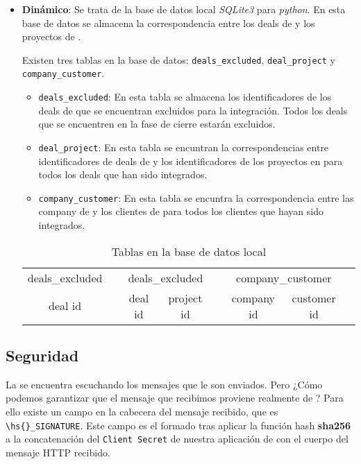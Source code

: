 \begin{itemize}[leftmargin=*]
\item \textbf{Dinámico}: Se trata de la base de datos local \textit{SQLite3} \cite{sqlite3} para \textit{python}.
 En esta base de datos se almacena la correspondencia entre los deals de \hs{} y los proyectos de \wday.
 
 Existen tres tablas en la base de datos: \verb|deals_excluded|, \verb|deal_project| y \verb|company_customer|.
 
 
 \begin{itemize}
	\item \verb|deals_excluded|: En esta tabla se almacena los identificadores de los deals de \hs{} 
	que se encuentran excluidos para la integración. Todos los deals que se encuentren en la fase de
	cierre estarán excluidos.
	\item \verb|deal_project|: En esta tabla se encuntran la correspondencias entre identificadores 
	de deals de \hs{} y los identificadores de los proyectos en \wday{} para todos los deals que han sido integrados.
	\item \verb|company_customer|: En esta tabla se encuntra la correspondencia entre las company de \hs{} y los clientes de \wday{}
	para todos los clientes que hayan sido integrados.
 \end{itemize}
 
\begin{table}
		\centering
		\begin{tabular}{
		|c|c@{\hskip 1cm} 
		|c|c|c@{\hskip 1cm} 
		|c|c|c@{\hskip 1cm}
		}
		\cline{1-1}\cline{3-4}\cline{6-7}
		deals\_excluded && \multicolumn{2}{c|}{deals\_excluded} && \multicolumn{2}{c|}{company\_customer} \\
	\cline{1-1}\cline{3-4}\cline{6-7}
	deal id && deal id & project id && company id & customer id \\
	\cline{1-1}\cline{3-4}\cline{6-7}
	\end{tabular}
	\caption{Tablas en la base de datos local}
	\label{tab:tables}
\end{table}

\end{itemize}




\subsection{Seguridad}


La \iface{} se encuentra escuchando los mensajes que le son enviados. Pero ¿Cómo podemos garantizar que el mensaje que recibimos proviene realmente de \hs{}?
Para ello existe un campo en la cabecera del mensaje recibido, que es \verb|\hs{}_SIGNATURE|. 
Este campo es el formado tras aplicar la función hash \textbf{sha256} a la concatenación del \verb|Client Secret| de nuestra aplicación de \hs{} con el cuerpo del mensaje HTTP recibido.

